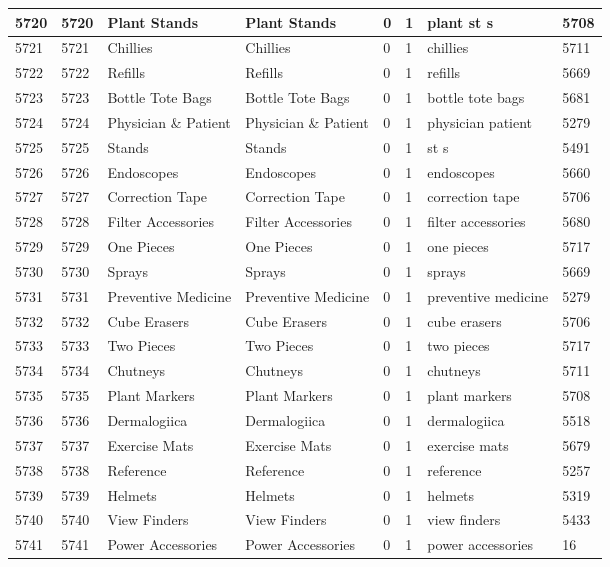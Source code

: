 \begin{longtable}{|l|l|l|l|l|l|l|l|}
5720 & 5720 & Plant Stands & Plant Stands & 0 & 1 & plant st s & 5708 \\ \hline 
5721 & 5721 & Chillies & Chillies & 0 & 1 & chillies & 5711 \\ \hline 
5722 & 5722 & Refills & Refills & 0 & 1 & refills & 5669 \\ \hline 
5723 & 5723 & Bottle Tote Bags & Bottle Tote Bags & 0 & 1 & bottle tote bags & 5681 \\ \hline 
5724 & 5724 & Physician \& Patient & Physician \& Patient & 0 & 1 & physician patient & 5279 \\ \hline 
5725 & 5725 & Stands & Stands & 0 & 1 & st s & 5491 \\ \hline 
5726 & 5726 & Endoscopes & Endoscopes & 0 & 1 & endoscopes & 5660 \\ \hline 
5727 & 5727 & Correction Tape & Correction Tape & 0 & 1 & correction tape & 5706 \\ \hline 
5728 & 5728 & Filter Accessories & Filter Accessories & 0 & 1 & filter accessories & 5680 \\ \hline 
5729 & 5729 & One Pieces & One Pieces & 0 & 1 & one pieces & 5717 \\ \hline 
5730 & 5730 & Sprays & Sprays & 0 & 1 & sprays & 5669 \\ \hline 
5731 & 5731 & Preventive Medicine & Preventive Medicine & 0 & 1 & preventive medicine & 5279 \\ \hline 
5732 & 5732 & Cube Erasers & Cube Erasers & 0 & 1 & cube erasers & 5706 \\ \hline 
5733 & 5733 & Two Pieces & Two Pieces & 0 & 1 & two pieces & 5717 \\ \hline 
5734 & 5734 & Chutneys & Chutneys & 0 & 1 & chutneys & 5711 \\ \hline 
5735 & 5735 & Plant Markers & Plant Markers & 0 & 1 & plant markers & 5708 \\ \hline 
5736 & 5736 & Dermalogiica & Dermalogiica & 0 & 1 & dermalogiica & 5518 \\ \hline 
5737 & 5737 & Exercise Mats & Exercise Mats & 0 & 1 & exercise mats & 5679 \\ \hline 
5738 & 5738 & Reference & Reference & 0 & 1 & reference & 5257 \\ \hline 
5739 & 5739 & Helmets & Helmets & 0 & 1 & helmets & 5319 \\ \hline 
5740 & 5740 & View Finders & View Finders & 0 & 1 & view finders & 5433 \\ \hline 
5741 & 5741 & Power Accessories & Power Accessories & 0 & 1 & power accessories & 16 \\ \hline 

\end{longtable}
